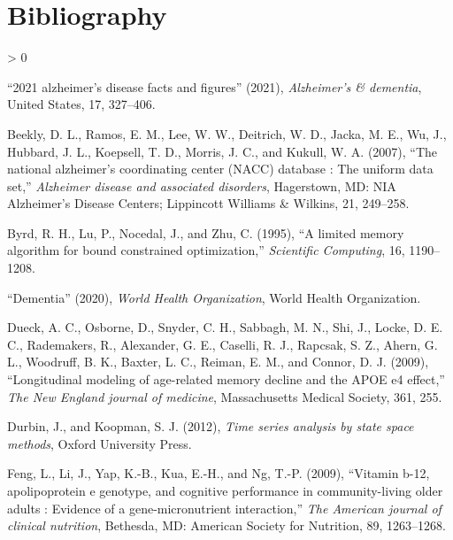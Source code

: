 \documentclass[
]{article}
\newlength{\cslhangindent}
\newenvironment{CSLReferences}[2] %
 {%
  \setlength{\parindent}{0pt}
  \ifodd #1 \everypar{\setlength{\hangindent}{\cslhangindent}}\ignorespaces\fi
  \ifnum #2 > 0
  \setlength{\parskip}{#2\baselineskip}
  \fi
 }%
 {}
\begin{document}
\newpage{}

\hypertarget{bibliography}{%
\section*{Bibliography}\label{bibliography}}

\hypertarget{refs}{}
\begin{CSLReferences}{1}{0}
\leavevmode\hypertarget{ref-Alz_assoc}{}%
{``2021 alzheimer's disease facts and figures''} (2021), \emph{Alzheimer's \& dementia}, United States, 17, 327--406.

\leavevmode\hypertarget{ref-NACC}{}%
Beekly, D. L., Ramos, E. M., Lee, W. W., Deitrich, W. D., Jacka, M. E., Wu, J., Hubbard, J. L., Koepsell, T. D., Morris, J. C., and Kukull, W. A. (2007), {``The national alzheimer's coordinating center (NACC) database : The uniform data set,''} \emph{Alzheimer disease and associated disorders}, Hagerstown, MD: NIA Alzheimer's Disease Centers; Lippincott Williams \& Wilkins, 21, 249--258.

\leavevmode\hypertarget{ref-conOpt}{}%
Byrd, R. H., Lu, P., Nocedal, J., and Zhu, C. (1995), {``A limited memory algorithm for bound constrained optimization,''} \emph{Scientific Computing}, 16, 1190--1208.

\leavevmode\hypertarget{ref-who_2020}{}%
{``Dementia''} (2020), \emph{World Health Organization}, World Health Organization.

\leavevmode\hypertarget{ref-APOErateLME}{}%
Dueck, A. C., Osborne, D., Snyder, C. H., Sabbagh, M. N., Shi, J., Locke, D. E. C., Rademakers, R., Alexander, G. E., Caselli, R. J., Rapcsak, S. Z., Ahern, G. L., Woodruff, B. K., Baxter, L. C., Reiman, E. M., and Connor, D. J. (2009), {``Longitudinal modeling of age-related memory decline and the APOE e4 effect,''} \emph{The New England journal of medicine}, Massachusetts Medical Society, 361, 255.

\leavevmode\hypertarget{ref-durbin_koopman_2012}{}%
Durbin, J., and Koopman, S. J. (2012), \emph{Time series analysis by state space methods}, Oxford University Press.

\leavevmode\hypertarget{ref-lmem1}{}%
Feng, L., Li, J., Yap, K.-B., Kua, E.-H., and Ng, T.-P. (2009), {``Vitamin b-12, apolipoprotein e genotype, and cognitive performance in community-living older adults : Evidence of a gene-micronutrient interaction,''} \emph{The American journal of clinical nutrition}, Bethesda, MD: American Society for Nutrition, 89, 1263--1268.


\end{CSLReferences}
\end{document}
